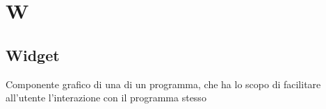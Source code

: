 \section*{W}
\markright{}
\subsection*{Widget}
Componente grafico di una  di un programma, che ha lo scopo di facilitare all'utente l'interazione con il programma stesso